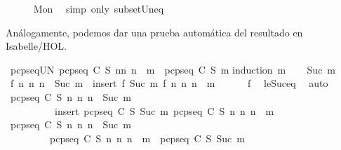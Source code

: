 \begin{isabellebody}
\ \ \ \ \isamarkupfalse%
\ Mon\ \isamarkupfalse%
\ {\isacharparenleft}simp\ only{\isacharcolon}\ subset{\isacharunderscore}Un{\isacharunderscore}eq{\isacharparenright}\isanewline
{}\isamarkupfalse%
%
\endisatagproof
{\isafoldproof}%
%
\isadelimproof
%
\endisadelimproof
%
\begin{isamarkuptext}%
Análogamente, podemos dar una prueba automática del resultado en Isabelle/HOL.%
\end{isamarkuptext}\isamarkuptrue%
\isamarkupfalse%
\ pcp{\isacharunderscore}seq{\isacharunderscore}UN{\isacharcolon}\ {\isachardoublequoteopen}{\isasymUnion}{\isacharbraceleft}pcp{\isacharunderscore}seq\ C\ S\ n{\isacharbar}n{\isachardot}\ n\ {\isasymle}\ m{\isacharbraceright}\ {\isacharequal}\ pcp{\isacharunderscore}seq\ C\ S\ m{\isachardoublequoteclose}\isanewline
%
\isadelimproof
%
\endisadelimproof
%
\isatagproof
{}\isamarkupfalse%
{\isacharparenleft}induction\ m{\isacharparenright}\isanewline
\ \ \isamarkupfalse%
\ {\isacharparenleft}Suc\ m{\isacharparenright}\isanewline
\ \ \isamarkupfalse%
\ {\isachardoublequoteopen}{\isacharbraceleft}f\ n\ {\isacharbar}n{\isachardot}\ n\ {\isasymle}\ Suc\ m{\isacharbraceright}\ {\isacharequal}\ insert\ {\isacharparenleft}f\ {\isacharparenleft}Suc\ m{\isacharparenright}{\isacharparenright}\ {\isacharbraceleft}f\ n\ {\isacharbar}n{\isachardot}\ n\ {\isasymle}\ m{\isacharbraceright}{\isachardoublequoteclose}\ \isanewline
\ \ \ \ \ f\ \isamarkupfalse%
\ le{\isacharunderscore}Suc{\isacharunderscore}eq\ \isamarkupfalse%
\ auto\isanewline
\ \ \isamarkupfalse%
\ {\isachardoublequoteopen}{\isacharbraceleft}pcp{\isacharunderscore}seq\ C\ S\ n\ {\isacharbar}n{\isachardot}\ n\ {\isasymle}\ Suc\ m{\isacharbraceright}\ {\isacharequal}\ \isanewline
\ \ \ \ \ \ \ \ \ \ insert\ {\isacharparenleft}pcp{\isacharunderscore}seq\ C\ S\ {\isacharparenleft}Suc\ m{\isacharparenright}{\isacharparenright}\ {\isacharbraceleft}pcp{\isacharunderscore}seq\ C\ S\ n\ {\isacharbar}n{\isachardot}\ n\ {\isasymle}\ m{\isacharbraceright}{\isachardoublequoteclose}\ \isacommand{{\isachardot}}\isamarkupfalse%
\isanewline
\ \ \isamarkupfalse%
\ {\isachardoublequoteopen}{\isasymUnion}{\isacharbraceleft}pcp{\isacharunderscore}seq\ C\ S\ n\ {\isacharbar}n{\isachardot}\ n\ {\isasymle}\ Suc\ m{\isacharbraceright}\ {\isacharequal}\ \isanewline
\ \ \ \ \ \ \ \ \ {\isasymUnion}{\isacharbraceleft}pcp{\isacharunderscore}seq\ C\ S\ n\ {\isacharbar}n{\isachardot}\ n\ {\isasymle}\ m{\isacharbraceright}\ {\isasymunion}\ pcp{\isacharunderscore}seq\ C\ S\ {\isacharparenleft}Suc\ m{\isacharparenright}{\isachardoublequoteclose}\ \isamarkupfalse%

\end{isabellebody}
